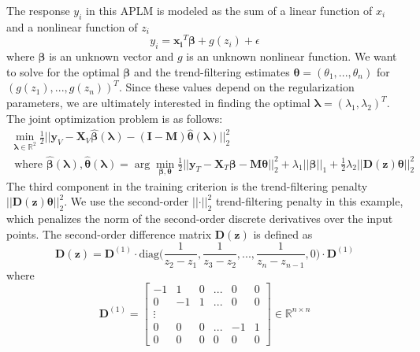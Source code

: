 \documentclass[10pt,letterpaper]{article}
\begin{document}
The response $y_i$ in this APLM is modeled as the sum of a linear function of $x_i$ and a nonlinear function of $z_i$
\begin{equation}
y_i = \boldsymbol{x_i}^T \boldsymbol{\beta} + g(z_i) + \epsilon
\end{equation}
where $\boldsymbol \beta$ is an unknown vector and $g$ is an unknown nonlinear function. We want to solve for the optimal $\boldsymbol{\beta}$ and the trend-filtering estimates $\boldsymbol{\theta} = (\theta_1, ..., \theta_n)$ for $(g(z_1), ..., g(z_n))^T$. Since these values depend on the regularization parameters, we are ultimately interested in finding the optimal $\boldsymbol\lambda = (\lambda_1, \lambda_2)^T$. The joint optimization problem is as follows:
\begin{equation}
\begin{array}{c}
\min_{\boldsymbol\lambda \in \mathbb{R}^2} \frac{1}{2}
\bigl\lvert\bigl\lvert
\boldsymbol{y}_V
- \boldsymbol{X}_V\hat{\boldsymbol{\beta}}(\boldsymbol{\lambda})
- (\boldsymbol{I} - \boldsymbol{M}) \hat{\boldsymbol{\theta}}(\boldsymbol{\lambda})
\bigl\rvert\bigl\rvert^2_2 \\
\text{ where }
\hat{\boldsymbol{\beta}}(\boldsymbol{\lambda}),
\hat{\boldsymbol{\theta}}(\boldsymbol{\lambda}) =
\arg\min_{\boldsymbol{\beta}, \boldsymbol{\theta}}
\frac{1}{2} \bigl\lvert\bigl\lvert
\boldsymbol{y}_T
- \boldsymbol{X}_T\boldsymbol{\beta}
- \boldsymbol{M} \boldsymbol{\theta} \bigl\rvert\bigl\rvert^2_2
+ \lambda_1 \lvert\lvert \boldsymbol{\beta}
\rvert \rvert_1
+ \frac{1}{2} \lambda_2 \lvert\lvert \boldsymbol{D}(\boldsymbol{z}) \boldsymbol{\theta} \rvert \rvert_2^2
\end{array}
\end{equation}
The third component in the training criterion is the trend-filtering penalty $\lvert\lvert \boldsymbol{D}(\boldsymbol{z}) \boldsymbol{\theta} \rvert \rvert_2^2$. We use the second-order $\lvert\lvert \cdot \rvert \rvert_2^2$ trend-filtering penalty in this example, which penalizes the norm of the second-order discrete derivatives over the input points. The second-order difference matrix $\boldsymbol{D}(\boldsymbol{z})$ is defined as
\begin{equation}
\boldsymbol{D}(\boldsymbol{z}) = \boldsymbol{D}^{(1)} \cdot
\text{diag} \big ( \frac{1}{z_{2} - z_1}, \frac{1}{z_{3} - z_2}, ... , \frac{1}{z_{n} - z_{n-1}}, 0 \big )
\cdot \boldsymbol{D}^{(1)}
\end{equation}
where
\begin{equation}
\boldsymbol{D}^{(1)} = 
\begin{bmatrix}
-1 & 1 & 0 & ... & 0 & 0 \\
0 & -1 & 1 & ... & 0 & 0 \\
\vdots \\
0 & 0 & 0 & ... & -1 & 1 \\
0 &0 & 0 &  0  &  0 & 0
\end{bmatrix}
\in
\mathbb{R}^{n\times n}
\end{equation}
\end{document}

